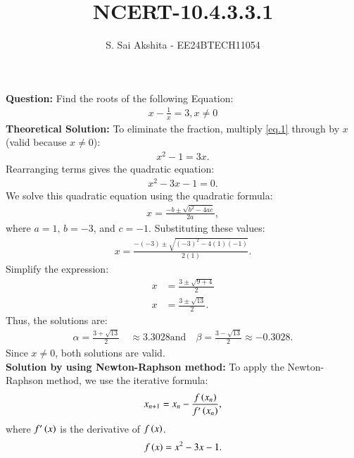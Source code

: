 \documentclass[journal,12pt,onecolumn]{IEEEtran}
\theoremstyle{remark}
\begin{document}

\vspace{3cm}

\title{NCERT-10.4.3.3.1}
\author{S. Sai Akshita - EE24BTECH11054}
\newpage
\maketitle
\bigskip

\renewcommand{\thefigure}{\theenumi}
\renewcommand{\thetable}{\theenumi}
\textbf{Question:} 
Find the roots of the following Equation:
\begin{align}
    x-\frac{1}{x} =3, x\neq 0 \label{eq.1}
\end{align}
\textbf{Theoretical Solution:}
To eliminate the fraction, multiply \ref{eq.1} through by $x$ (valid because $ x \neq 0 $):
\begin{align}
x^2 - 1 = 3x.
\end{align}
Rearranging terms gives the quadratic equation:
\begin{align}
x^2 - 3x - 1 = 0.
\end{align}
We solve this quadratic equation using the quadratic formula:
\begin{align}
x = \frac{-b \pm \sqrt{b^2 - 4ac}}{2a},
\end{align}
where $ a = 1 $, $ b = -3 $, and $ c = -1 $. Substituting these values:
\begin{align}
x = \frac{-(-3) \pm \sqrt{(-3)^2 - 4(1)(-1)}}{2(1)}.
\end{align}
Simplify the expression:
\begin{align}
x &= \frac{3 \pm \sqrt{9 + 4}}{2}\\
x &= \frac{3 \pm \sqrt{13}}{2}.
\end{align}
Thus, the solutions are:
\begin{align}
\alpha = \frac{3 + \sqrt{13}}{2} \quad \approx 3.3028 \text{and} \quad \beta = \frac{3 - \sqrt{13}}{2}\approx -0.3028.\label{nrm}
\end{align}
Since $ x \neq 0 $, both solutions are valid.\\
\textbf{Solution by using Newton-Raphson method:}
To apply the Newton-Raphson method, we use the iterative formula:
\begin{align}
x_{n+1} = x_n - \frac{f\left(x_n\right)}{f^\prime\left(x_n\right)},
\end{align}
where $ f^\prime\left(x\right) $ is the derivative of $f\left(x\right) $.\\
\begin{align}
    f\left(x\right)= x^2-3x-1.
\end{align}
\end{document}
